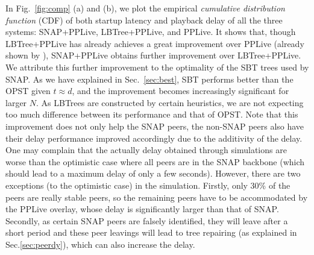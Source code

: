 \documentclass[conference]{IEEEtran}
\begin{document}
  In Fig.~\ref{fig:comp} (a) and (b), we plot the empirical \textit{cumulative distribution function} (CDF) of both startup latency and playback delay of all the three systems: SNAP+PPLive, LBTree+PPLive, and PPLive. It shows that, though LBTree+PPLive has already achieves a great improvement over PPLive (already shown by \cite{WangLX-INFOCOM08}), SNAP+PPLive obtains further improvement over LBTree+PPLive. We attribute this further improvement to the optimality of the SBT trees used by SNAP. As we have explained in Sec.~\ref{sec:best}, SBT performs better than the OPST given $t \approx d$, and the improvement becomes increasingly significant for larger $N$. As LBTrees are constructed by certain heuristics, we are not expecting too much difference between its performance and that of OPST. Note that this improvement does not only help the SNAP peers, the non-SNAP peers also have their delay performance improved accordingly due to the additivity of the delay. One may complain that the actually delay obtained through simulations are worse than the optimistic case where all peers are in the SNAP backbone (which should lead to a maximum delay of only a few seconds). However, there are two exceptions (to the optimistic case) in the simulation. Firstly, only 30\% of the peers are really stable peers, so the remaining peers have to be accommodated by the PPLive overlay, whose delay is significantly larger than that of SNAP. Secondly, as certain SNAP peers are falsely identified, they will leave after a short period and these peer leavings will lead to tree repairing (as explained in Sec.\ref{sec:peerdy}), which can also increase the delay.
\end{document}
